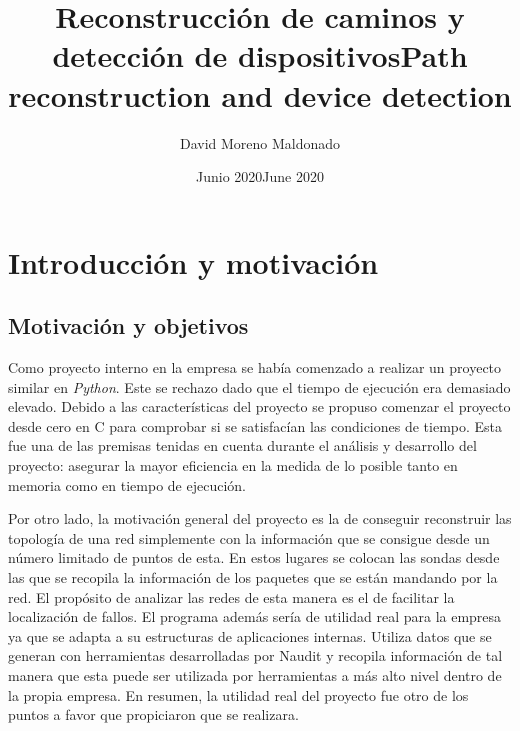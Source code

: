 \documentclass[twoside, 12pt]{epstfg}
\title[spa]{Reconstrucción de caminos y detección de dispositivos}
\title[eng]{Path reconstruction and device detection}
\author{David Moreno Maldonado}
\date[spa]{Junio 2020}
\date[eng]{June 2020}
\begin{document}

\frontmatter

\maketitle[spa]

\makeinnertitle[spa]


\tableofcontents
\clearpage
\listoftables
\clearpage
\listoffigures

\printnoidxglossaries

\mainmatter

\chapter{Introducción y motivación}

\section{Motivación y objetivos}
Como proyecto interno en la empresa se había comenzado a realizar un proyecto similar en \textit{Python}. Este se rechazo dado que el tiempo de ejecución era demasiado elevado. Debido a las características del proyecto se propuso comenzar el proyecto desde cero en C para comprobar si se satisfacían las condiciones de tiempo. Esta fue una de las premisas tenidas en cuenta durante el análisis y desarrollo del proyecto: asegurar la mayor eficiencia en la medida de lo posible tanto en memoria como en tiempo de ejecución.

Por otro lado, la motivación general del proyecto es la de conseguir reconstruir las topología de una red simplemente con la información que se consigue desde un número limitado de puntos de esta. En estos lugares se colocan las sondas desde las que se recopila la información de los paquetes que se están mandando por la red. El propósito de analizar las redes de esta manera es el de facilitar la localización de fallos. El programa además sería de utilidad real para la empresa ya que se adapta a su estructuras de aplicaciones internas. Utiliza datos que se generan con herramientas desarrolladas por Naudit y recopila información de tal manera que esta puede ser utilizada por herramientas a más alto nivel dentro de la propia empresa. En resumen, la utilidad real del proyecto fue otro de los puntos a favor que propiciaron que se realizara.
\end{document}
